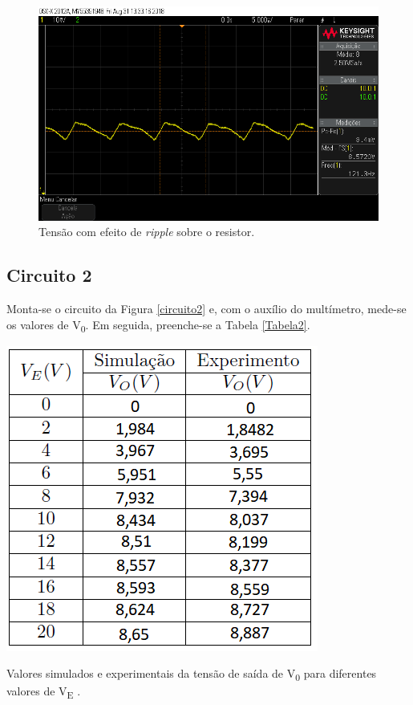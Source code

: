 \documentclass[journal, a4paper]{IEEEtran}
\begin{document}
    \begin{figure}[H]
		\begin{center}
		\includegraphics[width=\columnwidth]{scope_2_resistor.png}
		\caption{Tensão com efeito de \textit{ripple} sobre o resistor.}
		\label{scope_resistor}
		\end{center}
	\end{figure}

	\subsection{Circuito 2}
    
	     Monta-se o circuito da Figura \ref{circuito2} e, com o auxílio do multímetro, mede-se os valores de V\textsubscript{0}. Em seguida, preenche-se a Tabela \ref{Tabela2}.

	\begin{table}[H]
		\begin{center}
		\includegraphics[scale = 1]{Tabela2.png}
		\caption{Valores simulados e experimentais da tensão de saída de V\textsubscript{0} para diferentes valores de V\textsubscript{E} .}
		\label{Tabela2}
		\end{center}
	\end{table}
\end{document}
